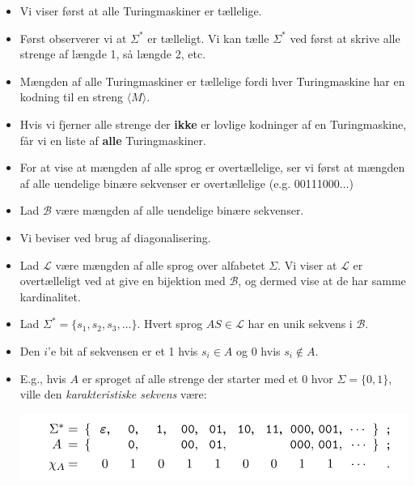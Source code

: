 \begin{frame}[allowframebreaks]
	\begin{itemize}
		\item Vi viser først at alle Turingmaskiner er tællelige.
		\item Først observerer vi at $\Sigma^{*}$ er tælleligt. Vi kan tælle $\Sigma^{*}$ ved først at skrive alle strenge af længde 1, så længde 2, etc.
		\item Mængden af alle Turingmaskiner er tællelige fordi hver Turingmaskine har en kodning til en streng \(\langle M \rangle\).
		\item Hvis vi fjerner alle strenge der \textbf{ikke} er lovlige kodninger af en Turingmaskine, får vi en liste af \textbf{alle} Turingmaskiner.
		\item For at vise at mængden af alle sprog er overtællelige, ser vi først at mængden af alle uendelige binære sekvenser er overtællelige (e.g. 00111000$\ldots$)
		\item Lad $\mathcal{B}$ være mængden af alle uendelige binære sekvenser.
		\item Vi beviser ved brug af diagonalisering.
		\item Lad $\mathcal{L}$ være mængden af alle sprog over alfabetet $\Sigma$. Vi viser at $\mathcal{L}$ er overtælleligt ved at give en bijektion med $\mathcal{B}$, og dermed vise at de har samme kardinalitet.
		\item Lad $\Sigma^{*} = \{s_{1}, s_{2}, s_{3}, \ldots\}$. Hvert sprog $AS \in \mathcal{L}$ har en unik sekvens i $\mathcal{B}$.
		\item Den $i$'e bit af sekvensen er et 1 hvis $s_{i} \in A$ og $0$ hvis $s_{i} \notin A$.
		\item E.g., hvis $A$ er sproget af alle strenge der starter med et $0$ hvor $\Sigma = \{0,1\}$, ville den \textit{karakteristiske sekvens} være:
		      \begin{center}
			      \includegraphics[scale=0.3]{figur/karsekv.png}
		      \end{center}


\end{itemize}
\end{frame}

